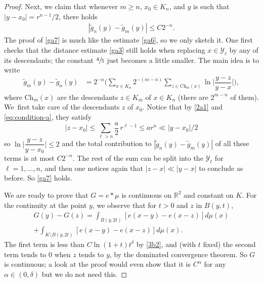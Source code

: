 \documentclass[JEP,XML,SOM,Unicode,published]{cedram}
\let\sm\setminus
\numberwithin{equation}{section}
\theoremstyle{plain}
\theoremstyle{definition}
\newcommand{\R}{\mathbb{R}}
\let\sm\setminus
\newcommand{\R}{\mathbb{R}}
\newcommand{\cY}{{\mathcal Y}}
\begin{document}
\begin{proof}
Next, we claim that whenever $ m \ge n$, $x_0 \in K_n$, and $y$ is such that $|y-x_0| = r^{n-1}/2$, there holds
\begin{align}
| \tilde{g}_n(y) - \tilde{g}_m(y) | \le C 2^{-n} \label{ga7}.
\end{align}
The proof of \eqref{ga7} is much like the estimate \eqref{ga6}, so we only sketch it.
One first checks that the distance estimate \eqref{ga3} still holds when replacing $x\in \cY_\ell$ by any of its descendants; the constant $\sfrac45$ just becomes a little smaller. The
main idea is to write
\begin{align*}
\tilde{g}_m(y) -\tilde{g}_n(y) & = 2^{-n} \biggl( \sum_{x \in K_n} 2^{-(m-n)} \sum_{z \in \mathrm{Ch}_m(x)}
\ln \Big |\dfrac{y-z}{y-x}\Big| \biggr),
\end{align*}
where $\mathrm{Ch}_m(x)$ are the descendants $z \in K_m$ of $x\in K_n$ (there are $2^{m-n}$ of them).
We~first take care of the descendants $z$ of $x_0$. Notice that by \eqref{2a1}
and \eqref{eq:condition-a}, they satisfy
\[
|z-x_0| \leq \sum_{\ell > n} \frac{a}{2} \, r^{\ell -1} \leq a r^n \ll |y-x_0|/2
\]
so $\ln \big |\dfrac{y-z}{y-x_0}\big| \leq 2$ and the total contribution to $| \tilde{g}_n(y) - \tilde{g}_m(y)|$
of all these terms is at most $C 2^{-n}$.
The rest of the sum can be split into the $\cY_\ell$ for $\ell=1,\dots,n$, and then one notices again
that $|z-x| \ll |y-x|$ to conclude as before. So \eqref{ga7} holds.

We are ready to prove that $G = e \ast \mu$ is continuous on $\R^2$ and constant on $K$.
For the continuity at the point $y$, we observe that for $t > 0$ and $z$ in $B(y,t)$,
\begin{multline*}
G(y) - G(z) = \int_{B(y,2t)} [e(x-y) - e(x-z)] d\mu(x)
\\ + \int_{K \sm B(y,2t)} [e(x-y) - e(x-z)] d\mu(x).
\end{multline*}
The first term is less than $C \ln(1+t) t^\delta$ by \eqref{3b2}, and (with $t$ fixed) the
second term tends to $0$ when $z$ tends to $y$, by the dominated convergence theorem.
So $G$ is continuous; a look at the proof would even show that it is $C^\alpha$ for any
$\alpha \in (0,\delta)$ but we do not need this.


\end{proof}
\end{document}
